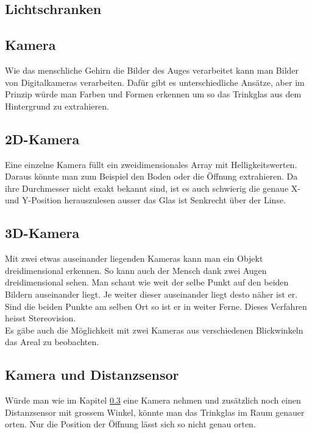 	
	\subsection{Lichtschranken}
	
	
	
	\subsection{Kamera}
	Wie das menschliche Gehirn die Bilder des Auges verarbeitet kann man Bilder von Digitalkameras verarbeiten. Dafür gibt es unterschiedliche Ansätze, aber im Prinzip würde man Farben und Formen erkennen um so das Trinkglas aus dem Hintergrund zu extrahieren.
	
		
		\subsection{2D-Kamera}
		\label{sec:2d}
		Eine einzelne Kamera füllt ein zweidimensionales Array mit Helligkeitswerten. 
		Daraus könnte man zum Beispiel den Boden oder die Öffnung extrahieren. Da ihre Durchmesser nicht exakt bekannt sind, ist es auch schwierig die genaue X- und Y-Position herauszulesen ausser das Glas ist Senkrecht über der Linse. 

		
		\subsection{3D-Kamera}
		Mit zwei etwas auseinander liegenden Kameras kann man ein Objekt dreidimensional erkennen. So kann auch der Mensch dank zwei Augen dreidimensional sehen. Man schaut wie weit der selbe Punkt auf den beiden Bildern auseinander liegt. Je weiter dieser auseinander liegt desto näher ist er. Sind die beiden Punkte am selben Ort so ist er in weiter Ferne. Dieses Verfahren heisst Stereovision.\\
		Es gäbe auch die Möglichkeit mit zwei Kameras aus verschiedenen Blickwinkeln das Areal zu beobachten.
		

		
		\subsection{Kamera und Distanzsensor}
		Würde man wie im Kapitel \ref{sec:2d} eine Kamera nehmen und zusätzlich noch einen Distanzsensor mit grossem Winkel, könnte man das Trinkglas im Raum genauer orten. Nur die Position der Öffnung lässt sich so nicht genau orten.
		